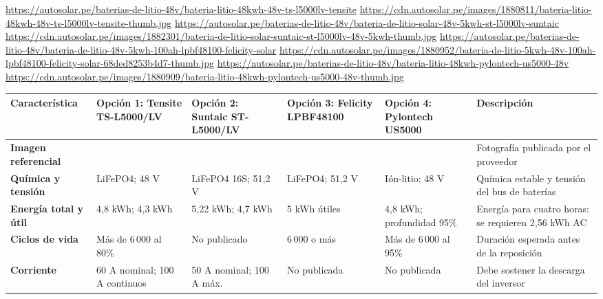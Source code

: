\begin{landscape}
\urldef{\cotui}\url{https://autosolar.pe/baterias-de-litio-48v/bateria-litio-48kwh-48v-ts-l5000lv-tensite}
\urldef{\cotuj}\url{https://cdn.autosolar.pe/images/1880811/bateria-litio-48kwh-48v-ts-l5000lv-tensite-thumb.jpg}
\urldef{\cotuk}\url{https://autosolar.pe/baterias-de-litio-48v/bateria-de-litio-solar-48v-5kwh-st-l5000lv-suntaic}
\urldef{\cotul}\url{https://cdn.autosolar.pe/images/1882301/bateria-de-litio-solar-suntaic-st-l5000lv-48v-5kwh-thumb.jpg}
\urldef{\cotum}\url{https://autosolar.pe/baterias-de-litio-48v/bateria-de-litio-48v-5kwh-100ah-lpbf48100-felicity-solar}
\urldef{\cotun}\url{https://cdn.autosolar.pe/images/1880952/bateria-de-litio-5kwh-48v-100ah-lpbf48100-felicity-solar-68ded8253b4d7-thumb.jpg}
\urldef{\cotuo}\url{https://autosolar.pe/baterias-de-litio-48v/bateria-litio-48kwh-pylontech-us5000-48v}
\urldef{\cotup}\url{https://cdn.autosolar.pe/images/1880909/bateria-litio-48kwh-pylontech-us5000-48v-thumb.jpg}
\par\noindent\begin{minipage}{\linewidth}\formatofichas\scriptsize\renewcommand{\arraystretch}{1.0}
\label{tab:cot-bat}
\begin{tabularx}{\linewidth}{@{}>{\raggedright\arraybackslash}p{3.0cm}YYYY>{\raggedright\arraybackslash}p{4.4cm}@{}}
\toprule
\textbf{Característica} & \textbf{Opción 1: Tensite TS-L5000/LV} & \textbf{Opción 2: Suntaic ST-L5000/LV} & \textbf{Opción 3: Felicity LPBF48100} & \textbf{Opción 4: Pylontech US5000} & \textbf{Descripción}\\\midrule
\textbf{Imagen referencial} &  &  &  &  & Fotografía publicada por el proveedor\\
\textbf{Química y tensión} & LiFePO4; 48 V & LiFePO4 16S; 51,2 V & LiFePO4; 51,2 V & Ión-litio; 48 V & Química estable y tensión del bus de baterías\\
\textbf{Energía total y útil} & 4,8 kWh; 4,3 kWh & 5,22 kWh; 4,7 kWh & 5 kWh útiles & 4,8 kWh; profundidad 95\% & Energía para cuatro horas: se requieren 2,56 kWh AC\\
\textbf{Ciclos de vida} & Más de 6\,000 al 80\% & No publicado & 6\,000 o más & Más de 6\,000 al 95\% & Duración esperada antes de la reposición\\
\textbf{Corriente} & 60 A nominal; 100 A continuos & 50 A nominal; 100 A máx. & No publicada & No publicada & Debe sostener la descarga del inversor\\

\end{tabularx}
\end{minipage}
\end{landscape}

